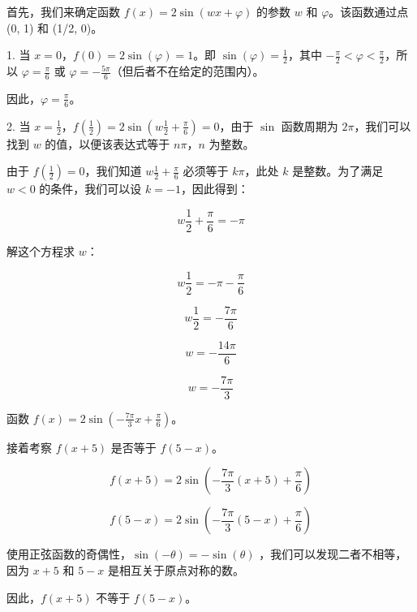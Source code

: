 首先，我们来确定函数 \( f(x) = 2\sin(wx + \varphi) \) 的参数 \( w \) 和 \( \varphi \)。该函数通过点 (0, 1) 和 (1/2, 0)。

1. 当 \( x = 0 \)，\( f(0) = 2\sin(\varphi) = 1 \)。即 \( \sin(\varphi) = \frac{1}{2} \)，其中 \( -\frac{\pi}{2} < \varphi < \frac{\pi}{2} \)，所以 \( \varphi = \frac{\pi}{6} \) 或 \( \varphi = -\frac{5\pi}{6} \)（但后者不在给定的范围内）。

   因此，\( \varphi = \frac{\pi}{6} \)。

2. 当 \( x = \frac{1}{2} \)，\( f\left(\frac{1}{2}\right) = 2\sin\left(w\frac{1}{2} + \frac{\pi}{6}\right) = 0 \)，由于 \( \sin \) 函数周期为 \( 2\pi \)，我们可以找到 \( w \) 的值，以便该表达式等于 \( n\pi \)，\( n \) 为整数。

由于 \( f\left(\frac{1}{2}\right) = 0 \)，我们知道 \(w\frac{1}{2} + \frac{\pi}{6}\) 必须等于 \( k\pi \)，此处 \( k \) 是整数。为了满足 \( w < 0 \) 的条件，我们可以设 \( k = -1 \)，因此得到：

\[ w\frac{1}{2} + \frac{\pi}{6} = -\pi \]

解这个方程求 \( w \)：

\[ w\frac{1}{2} = -\pi - \frac{\pi}{6} \]

\[ w\frac{1}{2} = -\frac{7\pi}{6} \]

\[ w = -\frac{14\pi}{6} \]

\[ w = -\frac{7\pi}{3} \]

函数 \( f(x) = 2\sin\left(-\frac{7\pi}{3}x + \frac{\pi}{6}\right) \)。

接着考察 \( f(x+5) \) 是否等于 \( f(5-x) \)。

\[ f(x+5) = 2\sin\left(-\frac{7\pi}{3}(x+5) + \frac{\pi}{6}\right) \]

\[ f(5-x) = 2\sin\left(-\frac{7\pi}{3}(5-x) + \frac{\pi}{6}\right) \]

使用正弦函数的奇偶性，\( \sin(-\theta) = -\sin(\theta) \) ，我们可以发现二者不相等，因为 \( x+5 \) 和 \( 5-x \) 是相互关于原点对称的数。

因此，\( f(x+5) \) 不等于 \( f(5-x) \)。
